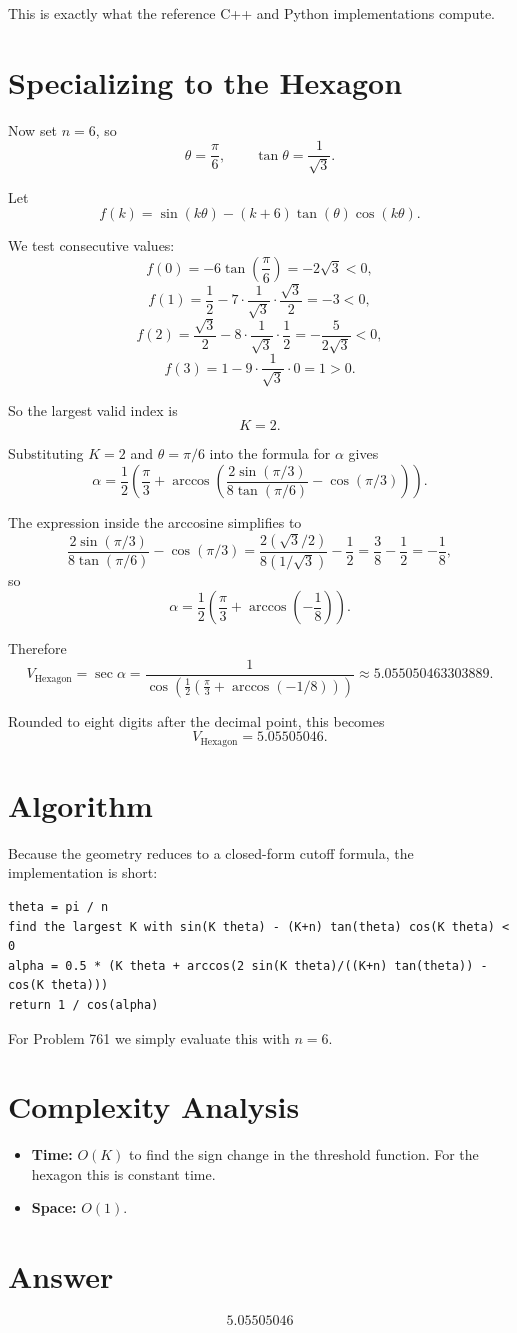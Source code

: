 \documentclass[11pt]{article}
\begin{document}
This is exactly what the reference C++ and Python implementations compute.

\section{Specializing to the Hexagon}
Now set $n=6$, so
\[
\theta = \frac{\pi}{6},
\qquad
\tan\theta = \frac{1}{\sqrt{3}}.
\]

Let
\[
f(k) = \sin(k\theta) - (k+6)\tan(\theta)\cos(k\theta).
\]

We test consecutive values:
\[
f(0) = -6\tan\!\left(\frac{\pi}{6}\right) = -2\sqrt{3} < 0,
\]
\[
f(1) = \frac{1}{2} - 7 \cdot \frac{1}{\sqrt{3}} \cdot \frac{\sqrt{3}}{2} = -3 < 0,
\]
\[
f(2) = \frac{\sqrt{3}}{2} - 8 \cdot \frac{1}{\sqrt{3}} \cdot \frac{1}{2}
= -\frac{5}{2\sqrt{3}} < 0,
\]
\[
f(3) = 1 - 9 \cdot \frac{1}{\sqrt{3}} \cdot 0 = 1 > 0.
\]

So the largest valid index is
\[
K = 2.
\]

Substituting $K=2$ and $\theta=\pi/6$ into the formula for $\alpha$ gives
\[
\alpha
=
\frac{1}{2}
\left(
\frac{\pi}{3}
+
\arccos\!\left(
\frac{2\sin(\pi/3)}{8\tan(\pi/6)} - \cos(\pi/3)
\right)
\right).
\]

The expression inside the arccosine simplifies to
\[
\frac{2\sin(\pi/3)}{8\tan(\pi/6)} - \cos(\pi/3)
=
\frac{2(\sqrt{3}/2)}{8(1/\sqrt{3})} - \frac{1}{2}
=
\frac{3}{8} - \frac{1}{2}
=
-\frac{1}{8},
\]
so
\[
\alpha = \frac{1}{2}\left(\frac{\pi}{3} + \arccos\!\left(-\frac{1}{8}\right)\right).
\]

Therefore
\[
V_{\mathrm{Hexagon}}
=
\sec \alpha
=
\frac{1}{\cos\!\left(\frac{1}{2}\left(\frac{\pi}{3} + \arccos(-1/8)\right)\right)}
\approx 5.055050463303889.
\]

Rounded to eight digits after the decimal point, this becomes
\[
V_{\mathrm{Hexagon}} = 5.05505046.
\]

\section{Algorithm}
Because the geometry reduces to a closed-form cutoff formula, the implementation is short:
\begin{verbatim}
theta = pi / n
find the largest K with sin(K theta) - (K+n) tan(theta) cos(K theta) < 0
alpha = 0.5 * (K theta + arccos(2 sin(K theta)/((K+n) tan(theta)) - cos(K theta)))
return 1 / cos(alpha)
\end{verbatim}

For Problem 761 we simply evaluate this with $n = 6$.

\section{Complexity Analysis}
\begin{itemize}
    \item \textbf{Time:} $O(K)$ to find the sign change in the threshold function. For the hexagon this is constant time.
    \item \textbf{Space:} $O(1)$.
\end{itemize}

\section{Answer}
\[
\boxed{5.05505046}
\]
\end{document}
